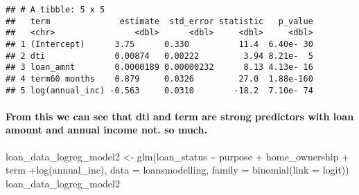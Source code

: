 \documentclass[
]{article}
\newenvironment{Shaded}{\begin{snugshade}}{\end{snugshade}}
\newcommand{\AttributeTok}[1]{\textcolor[rgb]{0.77,0.63,0.00}{#1}}
\newcommand{\FunctionTok}[1]{\textcolor[rgb]{0.00,0.00,0.00}{#1}}
\newcommand{\NormalTok}[1]{#1}
\newcommand{\OtherTok}[1]{\textcolor[rgb]{0.56,0.35,0.01}{#1}}
\newcommand{\SpecialCharTok}[1]{\textcolor[rgb]{0.00,0.00,0.00}{#1}}
\newcommand{\StringTok}[1]{\textcolor[rgb]{0.31,0.60,0.02}{#1}}
\begin{document}
\begin{verbatim}
## # A tibble: 5 x 5
##   term              estimate  std_error statistic   p_value
##   <chr>                <dbl>      <dbl>     <dbl>     <dbl>
## 1 (Intercept)      3.75      0.330          11.4  6.40e- 30
## 2 dti              0.00874   0.00222         3.94 8.21e-  5
## 3 loan_amnt        0.0000189 0.00000232      8.13 4.13e- 16
## 4 term60 months    0.879     0.0326         27.0  1.88e-160
## 5 log(annual_inc) -0.563     0.0310        -18.2  7.10e- 74
\end{verbatim}

\hypertarget{from-this-we-can-see-that-dti-and-term-are-strong-predictors-with-loan-amount-and-annual-income-not.-so-much.}{%
\paragraph{From this we can see that dti and term are strong predictors
with loan amount and annual income not. so
much.}\label{from-this-we-can-see-that-dti-and-term-are-strong-predictors-with-loan-amount-and-annual-income-not.-so-much.}}

\begin{Shaded}
\begin{Highlighting}[]
\NormalTok{loan\_data\_logreg\_model2 }\OtherTok{\textless{}{-}} \FunctionTok{glm}\NormalTok{(loan\_status }\SpecialCharTok{\textasciitilde{}}\NormalTok{ purpose }\SpecialCharTok{+}\NormalTok{ home\_ownership }\SpecialCharTok{+}\NormalTok{ term }\SpecialCharTok{+}\FunctionTok{log}\NormalTok{(annual\_inc), }\AttributeTok{data =}\NormalTok{ loansmodelling, }\AttributeTok{family =} \FunctionTok{binomial}\NormalTok{(}\AttributeTok{link =} \StringTok{\textquotesingle{}logit\textquotesingle{}}\NormalTok{))}
\NormalTok{loan\_data\_logreg\_model2}
\end{Highlighting}
\end{Shaded}
\end{document}

